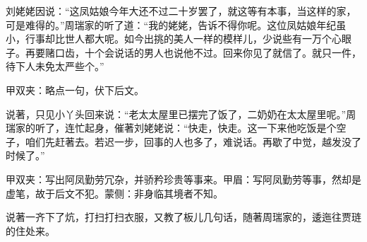 \begin{parag}
    刘姥姥因说：“这凤姑娘今年大还不过二十岁罢了，就这等有本事，当这样的家，可是难得的。”周瑞家的听了道：“我的姥姥，告诉不得你呢。这位凤姑娘年纪虽小，行事却比世人都大呢。如今出挑的美人一样的模样儿，少说些有一万个心眼子。再要赌口齿，十个会说话的男人也说他不过。回来你见了就信了。就只一件，待下人未免太严些个。”\begin{note}甲双夹：略点一句，伏下后文。\end{note}说著，只见小丫头回来说：“老太太屋里已摆完了饭了，二奶奶在太太屋里呢。”周瑞家的听了，连忙起身，催著刘姥姥说：“快走，快走。这一下来他吃饭是个空子，咱们先赶著去。若迟一步，回事的人也多了，难说话。再歇了中觉，越发没了时候了。”\begin{note}甲双夹：写出阿凤勤劳冗杂，并骄矜珍贵等事来。甲眉：写阿凤勤劳等事，然却是虚笔，故于后文不犯。蒙侧：非身临其境者不知。\end{note}说著一齐下了炕，打扫打扫衣服，又教了板儿几句话，随著周瑞家的，逶迤往贾琏的住处来。
\end{parag}


